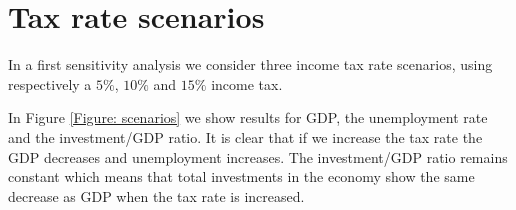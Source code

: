 \section{Tax rate scenarios}
In a first sensitivity analysis we consider three income tax rate scenarios, using respectively a $5\%$, $10\%$ and $15\%$ income tax.

In Figure \ref{Figure: scenarios} we show results for GDP, the unemployment rate and the investment/GDP ratio.
It is clear that if we increase the tax rate the GDP decreases and unemployment increases.
The investment/GDP ratio remains constant which means that total investments in the economy show the same decrease as GDP when the tax rate is increased.






